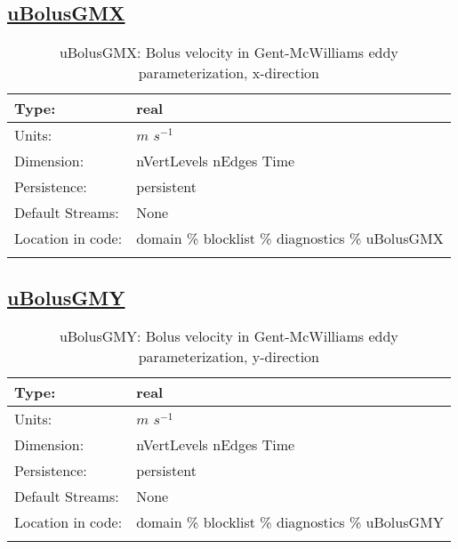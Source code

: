 \subsection[uBolusGMX]{\hyperref[sec:var_tab_diagnostics]{uBolusGMX}}
\label{subsec:var_sec_diagnostics_uBolusGMX}
\begin{center}
\begin{longtable}{| p{2.0in} | p{4.0in} |}
        \hline 
        Type: & real \\
        \hline 
        Units: & $m$ $s^{-1}$ \\
        \hline 
        Dimension: & nVertLevels nEdges Time \\
        \hline 
        Persistence: & persistent \\
        \hline 
		 Default Streams: & None \\
        \hline 
		 Location in code: & domain \% blocklist \% diagnostics \% uBolusGMX \\
		 \hline 
    \caption{uBolusGMX: Bolus velocity in Gent-McWilliams eddy parameterization, x-direction}
\end{longtable}
\end{center}
\subsection[uBolusGMY]{\hyperref[sec:var_tab_diagnostics]{uBolusGMY}}
\label{subsec:var_sec_diagnostics_uBolusGMY}
\begin{center}
\begin{longtable}{| p{2.0in} | p{4.0in} |}
        \hline 
        Type: & real \\
        \hline 
        Units: & $m$ $s^{-1}$ \\
        \hline 
        Dimension: & nVertLevels nEdges Time \\
        \hline 
        Persistence: & persistent \\
        \hline 
		 Default Streams: & None \\
        \hline 
		 Location in code: & domain \% blocklist \% diagnostics \% uBolusGMY \\
		 \hline 
    \caption{uBolusGMY: Bolus velocity in Gent-McWilliams eddy parameterization, y-direction}
\end{longtable}
\end{center}
